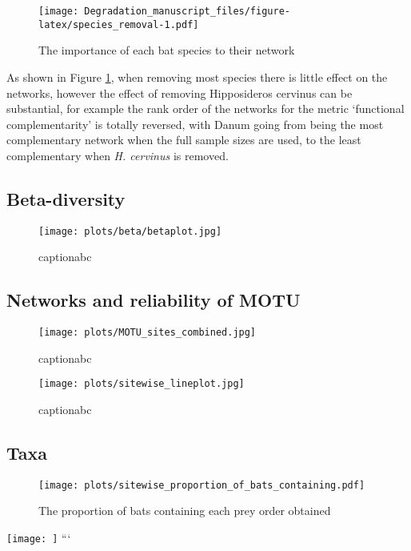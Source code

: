 \documentclass[]{article}
\begin{document}
\begin{figure}
\centering
\texttt{[image: Degradation\_manuscript\_files/figure-latex/species\_removal-1.pdf]}
\caption{\label{fig:sp_removal}The importance of each bat species to
their network}
\end{figure}

As shown in Figure \ref{fig:sp_removal}, when removing most species
there is little effect on the networks, however the effect of removing
Hipposideros cervinus can be substantial, for example the rank order of
the networks for the metric `functional complementarity' is totally
reversed, with Danum going from being the most complementary network
when the full sample sizes are used, to the least complementary when
\emph{H. cervinus} is removed.

\subsection{Beta-diversity}\label{beta-diversity}

\begin{figure}
\centering
\texttt{[image: plots/beta/betaplot.jpg]}
\caption{captionabc}
\end{figure}

\subsection{Networks and reliability of
MOTU}\label{networks-and-reliability-of-motu}

\begin{figure}
\centering
\texttt{[image: plots/MOTU\_sites\_combined.jpg]}
\caption{captionabc}
\end{figure}

\begin{figure}
\centering
\texttt{[image: plots/sitewise\_lineplot.jpg]}
\caption{captionabc}
\end{figure}

\subsection{Taxa}\label{taxa}

\begin{figure}
\centering
\texttt{[image: plots/sitewise\_proportion\_of\_bats\_containing.pdf]}
\caption{The proportion of bats containing each prey order obtained}
\end{figure}

\texttt{[image: ]} ```
\end{document}
